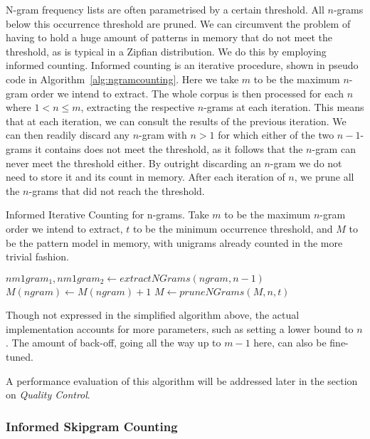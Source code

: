 \documentclass[a4paper,12pt]{article}
\begin{document}
N-gram frequency lists are often parametrised by a certain threshold. All
$n$-grams below this occurrence threshold are pruned. We can circumvent the
problem of having to hold a huge amount of patterns in memory that do not meet
the threshold, as is typical in a Zipfian distribution. We do this by employing
informed counting. Informed counting is an iterative procedure, shown in pseudo
code in Algorithm~\ref{alg:ngramcounting}. Here we take $m$ to be the maximum
$n$-gram order we intend to extract. The whole corpus is then processed for
each $n$ where $1<n\leq m$, extracting the respective $n$-grams at each
iteration. This means that at each iteration, we can consult the results of the
previous iteration. We can then readily discard any $n$-gram with $n>1$ for
which either of the two $n-1$-grams it contains does not
meet the threshold, as it follows that the $n$-gram can never meet the
threshold either. By outright discarding an $n$-gram we do not need to store it
and its count in memory. After each iteration of $n$, we prune all the
$n$-grams that did not reach the threshold.


\begin{algorithm} \caption{Informed Iterative Counting for n-grams.  Take $m$
to be the maximum $n$-gram order we intend to extract, $t$ to be the minimum occurrence threshold, and $M$ to be the
pattern model in memory, with unigrams already counted in the more trivial fashion.}
\label{alg:ngramcounting}
\begin{algorithmic}
            \State  $nm1gram_1, nm1gram_2 \leftarrow extractNGrams(ngram,n-1)$
                \State $M(ngram) \leftarrow M(ngram) + 1$
            \EndIf
        \EndFor 
    \EndFor
    \State $M \leftarrow pruneNGrams(M,n,t)$
\EndFor \\
\end{algorithmic}
\end{algorithm}

Though not expressed in the simplified algorithm above, the actual
implementation accounts for more parameters, such as setting a lower bound to
$n$. The amount of back-off, going all the way up to $m-1$ here, can also be
fine-tuned.

A performance evaluation of this algorithm will be addressed later in the
section on \emph{Quality Control}.

\subsubsection{Informed Skipgram Counting}
\label{sec:skipgramcount}
\end{document}
